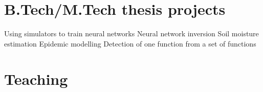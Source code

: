 \documentclass[11pt,a4paper,sans]{moderncv} %
\begin{document}
\section{B.Tech/M.Tech thesis projects}
 {Using simulators to train neural networks}
 {Neural network inversion}
 {Soil moisture estimation}
 {Epidemic modelling}
 {Detection of one function from a set of functions}
\fi

\section{Teaching}
\iflong
\end{document}
